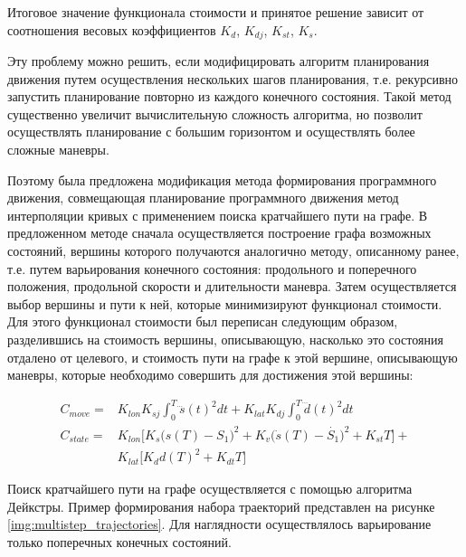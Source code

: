Итоговое значение функционала стоимости и принятое решение зависит от соотношения весовых коэффициентов $K_d$, $K_{dj}$,
$K_{st}$, $K_s$.

Эту проблему можно решить, если модифицировать алгоритм планирования движения путем осуществления нескольких шагов
планирования, т.е. рекурсивно запустить планирование повторно из каждого конечного состояния. Такой метод существенно
увеличит вычислительную сложность алгоритма, но позволит осуществлять планирование с большим горизонтом и осуществлять
более сложные маневры.

Поэтому была предложена модификация метода формирования программного движения, совмещающая планирование программного
движения метод интерполяции кривых с применением поиска кратчайшего пути на графе. В предложенном методе сначала
осуществляется построение графа возможных состояний, вершины которого получаются аналогично методу, описанному ранее,
т.е. путем варьирования конечного состояния: продольного и поперечного положения, продольной скорости и длительности
маневра. Затем осуществляется выбор вершины и пути к ней, которые минимизируют функционал стоимости. Для этого
функционал стоимости был переписан следующим образом, разделившись на стоимость вершины, описывающую, насколько это
состояния отдалено от целевого, и  стоимость пути на графе к этой вершине, описывающую маневры, которые необходимо
совершить для достижения этой вершины:

\begin{align}
    C_{move}  = &K_{lon}K_{sj}\int_{0}^{T}{\dddot{s}(t)^2dt} + K_{lat}K_{dj}\int_{0}^{T}{\dddot{d}(t)^2dt} \\
    C_{state} = &K_{lon}\Big[K_s \big(s(T) - S_1\big)^2 + K_v \big(\dot{s}(T) - \dot{S_1}\big)^2 + K_{st} T\Big] + \\
                &K_{lat}\Big[K_d d(T)^2 + K_{dt} T\Big] \nonumber
\end{align}

Поиск кратчайшего пути на графе осуществляется с помощью алгоритма Дейкстры. Пример формирования набора траекторий
представлен на рисунке \ref{img:multistep_trajectories}. Для наглядности осуществлялось варьирование только поперечных
конечных состояний.

